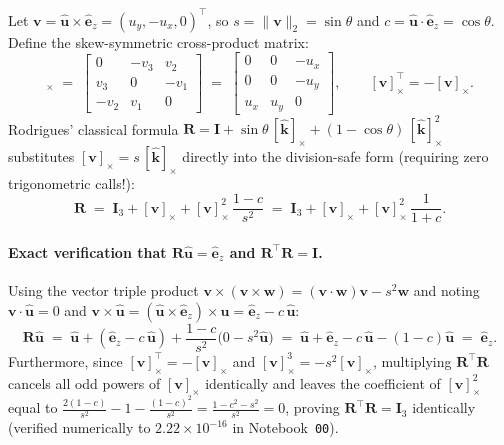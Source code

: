 \documentclass[10pt,a4paper]{article}
\renewcommand{\_}{\origunderscore\allowbreak}
\begin{document}
Let $\mathbf{v} = \hat{\mathbf{u}} \times \hat{\mathbf{e}}_z = (u_y, -u_x, 0)^\top$, so $s = \|\mathbf{v}\|_2 = \sin\theta$ and $c = \hat{\mathbf{u}}\cdot\hat{\mathbf{e}}_z = \cos\theta$. Define the skew-symmetric cross-product matrix:
\begin{equation}
    [\mathbf{v}]_\times \;=\;
    \begin{bmatrix}
        0 & -v_3 & v_2 \\
        v_3 & 0 & -v_1 \\
        -v_2 & v_1 & 0
    \end{bmatrix}
    \;=\;
    \begin{bmatrix}
        0 & 0 & -u_x \\
        0 & 0 & -u_y \\
        u_x & u_y & 0
    \end{bmatrix},
    \qquad [\mathbf{v}]_\times^\top = -[\mathbf{v}]_\times.
\end{equation}
Rodrigues' classical formula $\mathbf{R} = \mathbf{I} + \sin\theta\,[\hat{\mathbf{k}}]_\times + (1-\cos\theta)\,[\hat{\mathbf{k}}]_\times^2$ substitutes $[\mathbf{v}]_\times = s\,[\hat{\mathbf{k}}]_\times$ directly into the division-safe form (requiring zero trigonometric calls!):
\begin{equation}
    \mathbf{R} \;=\; \mathbf{I}_3 + [\mathbf{v}]_\times + [\mathbf{v}]_\times^2\,\frac{1 - c}{s^2}
    \;=\; \mathbf{I}_3 + [\mathbf{v}]_\times + [\mathbf{v}]_\times^2\,\frac{1}{1 + c}.
    \label{eq:rodrigues_proof}
\end{equation}
\paragraph{Exact verification that $\mathbf{R}\hat{\mathbf{u}} = \hat{\mathbf{e}}_z$ and $\mathbf{R}^\top\mathbf{R} = \mathbf{I}$.}
Using the vector triple product $\mathbf{v}\times(\mathbf{v}\times\mathbf{w}) = (\mathbf{v}\cdot\mathbf{w})\mathbf{v} - s^2\mathbf{w}$ and noting $\mathbf{v}\cdot\hat{\mathbf{u}} = 0$ and $\mathbf{v}\times\hat{\mathbf{u}} = (\hat{\mathbf{u}}\times\hat{\mathbf{e}}_z)\times\hat{\mathbf{u}} = \hat{\mathbf{e}}_z - c\,\hat{\mathbf{u}}$:
\[
    \mathbf{R}\hat{\mathbf{u}}
    \;=\; \hat{\mathbf{u}} + (\hat{\mathbf{e}}_z - c\,\hat{\mathbf{u}}) + \frac{1-c}{s^2}\bigl(0 - s^2\hat{\mathbf{u}}\bigr)
    \;=\; \hat{\mathbf{u}} + \hat{\mathbf{e}}_z - c\,\hat{\mathbf{u}} - (1-c)\hat{\mathbf{u}}
    \;=\; \hat{\mathbf{e}}_z.
\]
Furthermore, since $[\mathbf{v}]_\times^\top = -[\mathbf{v}]_\times$ and $[\mathbf{v}]_\times^3 = -s^2[\mathbf{v}]_\times$, multiplying $\mathbf{R}^\top\mathbf{R}$ cancels all odd powers of $[\mathbf{v}]_\times$ identically and leaves the coefficient of $[\mathbf{v}]_\times^2$ equal to $\frac{2(1-c)}{s^2} - 1 - \frac{(1-c)^2}{s^2} = \frac{1 - c^2 - s^2}{s^2} = 0$, proving $\mathbf{R}^\top\mathbf{R} = \mathbf{I}_3$ identically (verified numerically to $2.22\times 10^{-16}$ in Notebook~\texttt{00}).
\end{document}
